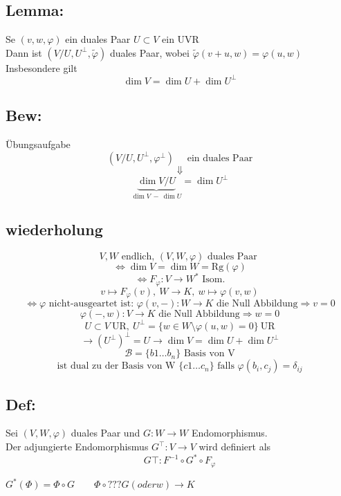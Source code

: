 \documentclass[titlepage,12pt,a4paper,ngerman]{report}
\newcommand{\tx}[1]{\textrm{#1}}
\newcommand{\ub}[1]{\underbrace{#1}}
\begin{document}
\subsection{Lemma:}
Se $ (v,w,\varphi) $ ein duales Paar $ U\subset V $ ein UVR\\
Dann ist $ (V/U, U^\perp, \tilde{\varphi}) $ duales Paar, wobei $ \tilde{\varphi}(v+u,w) = \varphi(u,w) $\\
Insbesondere gilt $$ \dim V = \dim U + \dim U^\perp $$
\subsection*{Bew:}
Übungsaufgabe
$$ (V/U,U^\perp,\varphi^\perp) \quad \tx{ ein duales Paar}$$
$$ \Downarrow$$
$$ \ub{\dim V/U}_{\dim V \  -\  \dim U} = \dim U^\perp $$


\subsection{wiederholung}
$$V, W \tx{ endlich, } (V,W,\varphi) \tx{ duales Paar }$$ 
$$\Leftrightarrow \dim V = \dim W = \tx{Rg}(\varphi)$$  
$$\Leftrightarrow F_\varphi: V \to W^* \tx{ Isom.}$$
$$v \mapsto F_\varphi(v),\ W \to K,\ w \mapsto \varphi(v,w)$$
$$\Leftrightarrow \varphi \tx{ nicht-ausgeartet ist: } \varphi(v,-): W \to K \tx{ die Null Abbildung} \Rightarrow v = 0$$
$$\varphi(-,w): V \to K  \tx{ die Null Abbildung} \Rightarrow w = 0$$
$$U \subset V\ \tx{UR},\ U^\perp = \{w \in W \setminus \varphi(u,w) = 0\}\ \tx{UR}$$
$$\rightarrow(U^\perp)^\perp = U \rightarrow \dim V = \dim U + \dim U^\perp$$
$$\mathcal B = \{b1 \dots b_n\}\tx{ Basis von V}$$
$$\tx{ist dual zu der Basis von W }\{c1 \dots c_n\} \tx{ falls } \varphi(b_i,c_j) = \delta_{ij}$$
\subsection{Def:}
Sei $(V,W,\varphi)$ duales Paar und $G:W \to W$ Endomorphismus.\\
Der adjungierte Endomorphismus $G^\top: V \to V$ wird definiert als $$G\top:F^{-1} \circ G^* \circ F_\varphi$$
\begin{center}
\end{center}
$ G^*(\Phi) = \Phi \circ G \qquad \Phi \circ ??? G (oder w ) \to K $
\end{document}
